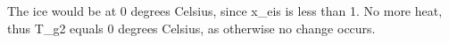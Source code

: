 The ice would be at 0 degrees Celsius, since x_eis is less than 1. No more heat, thus T_g2 equals 0 degrees Celsius, as otherwise no change occurs.